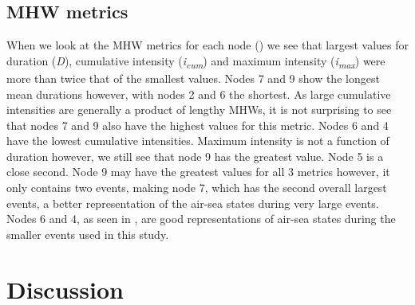 \documentclass[a4paper,10pt,review]{elsarticle}
\begin{document}
\subsection{MHW metrics}
When we look at the MHW metrics for each node () we see that largest values for duration (\emph{D}), cumulative intensity (\emph{i\textsubscript{cum}}) and maximum intensity (\emph{i\textsubscript{max}}) were more than twice that of the smallest values. Nodes 7 and 9 show the longest mean durations however, with nodes 2 and 6 the shortest. As large cumulative intensities are generally a product of lengthy MHWs, it is not surprising to see that nodes 7 and 9 also have the highest values for this metric. Nodes 6 and 4 have the lowest cumulative intensities. Maximum intensity is not a function of duration however, we still see that node 9 has the greatest value. Node 5 is a close second. Node 9 may have the greatest values for all 3 metrics however, it only contains two events, making node 7, which has the second overall largest events, a better representation of the air-sea states during very large events. Nodes 6 and 4, as seen in , are good representations of air-sea states during the smaller events used in this study.

\section{Discussion}
\end{document}
